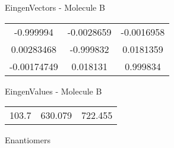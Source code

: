 \begin{multicols}{2}
\begin{center}
\vtab
 EingenVectors - Molecule B     \\
\vtab
\begin{tabular}{|c c c|}
-0.999994	 & 	-0.0028659	 & 	-0.0016958	 \\
0.00283468	 & 	-0.999832	 & 	0.0181359	 \\
-0.00174749	 & 	0.018131	 & 	0.999834
\end{tabular}

\vtab
 EingenValues - Molecule B     \\
\vtab
\begin{tabular}{|c c c|}
103.7	 & 	630.079	 & 	722.455	 \\
\end{tabular}

\end{center}
\end{multicols}
\begin{center}
\vtab
\vtab
\textcolor{NavyBlue}{\Large Enantiomers}
\end{center}

 \newpage

